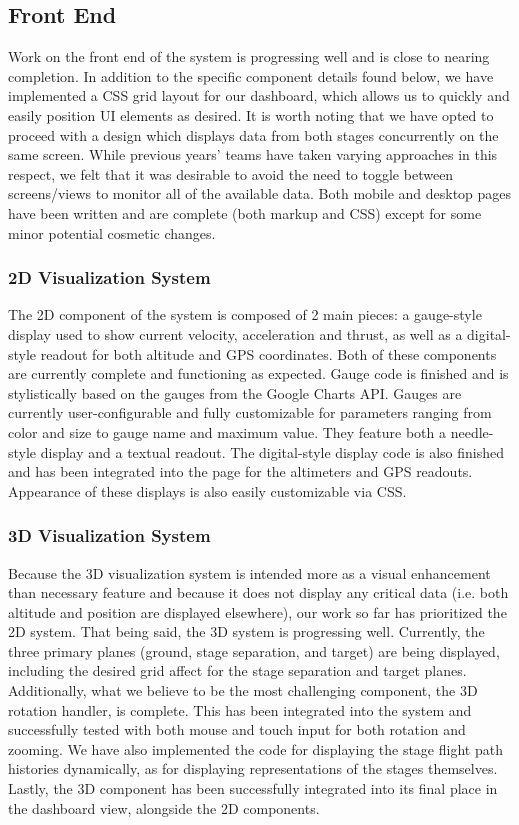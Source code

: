 \documentclass[journal,10pt,onecolumn,compsoc]{IEEEtran}
\begin{document}
	\subsection{Front End}
		Work on the front end of the system is progressing well and is close to nearing completion.
		In addition to the specific component details found below, we have implemented a CSS grid layout for our dashboard, which allows us to quickly and easily position UI elements as desired.
		It is worth noting that we have opted to proceed with a design which displays data from both stages concurrently on the same screen.
		While previous years' teams have taken varying approaches in this respect, we felt that it was desirable to avoid the need to toggle between screens/views to monitor all of the available data.
    Both mobile and desktop pages have been written and are complete (both markup and CSS) except for some minor potential cosmetic changes.
	
		\subsubsection{2D Visualization System}
			The 2D component of the system is composed of 2 main pieces: a gauge-style display used to show current velocity, acceleration and thrust, as well as a digital-style readout for both altitude and GPS coordinates.
			Both of these components are currently complete and functioning as expected.
			Gauge code is finished and is stylistically based on the gauges from the Google Charts API.
			Gauges are currently user-configurable and fully customizable for parameters ranging from color and size to gauge name and maximum value.
			They feature both a needle-style display and a textual readout.
			The digital-style display code is also finished and has been integrated into the page for the altimeters and GPS readouts. 
			Appearance of these displays is also easily customizable via CSS.
			
		\subsubsection{3D Visualization System}
			Because the 3D visualization system is intended more as a visual enhancement than necessary feature and because it does not display any critical data (i.e. both altitude and position are displayed elsewhere), our work so far has prioritized the 2D system.
			That being said, the 3D system is progressing well.
			Currently, the three primary planes (ground, stage separation, and target) are being displayed, including the desired grid affect for the stage separation and target planes.
			Additionally, what we believe to be the most challenging component, the 3D rotation handler, is complete.
			This has been integrated into the system and successfully tested with both mouse and touch input for both rotation and zooming.
			We have also implemented the code for displaying the stage flight path histories dynamically, as for displaying representations of the stages themselves.
			Lastly, the 3D component has been successfully integrated into its final place in the dashboard view, alongside the 2D components.	
\newpage
\end{document}
